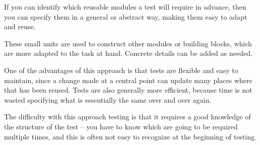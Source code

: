 If you can identify which reusable modules a test will require in advance, then you can specify them in a general or abstract way, making them easy to adapt and reuse. 

These small units are used to construct other modules or building blocks, which are more adapted to the  task at hand. Concrete details can be added as needed.

One of the advantages of this approach is that tests are flexible and easy to maintain, since a change made at a central point can update many places where that \gdcase{} has been reused. Tests are also generally more efficient, because time is not wasted specifying what is essentially the same \gdcase{} over and over again. 

The difficulty with this approach testing is that it requires a good knowledge of the structure of the test -- you have to know which \gdcases{} are going to be required multiple times, and this is often not easy to recognize at the beginning of testing. 





